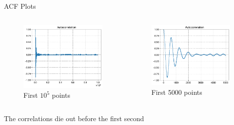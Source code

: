 \documentclass[
10pt,
aspectratio=169,
]{beamer}
\begin{document}
\begin{frame}[c]{ACF Plots}
\begin{columns}[onlytextwidth]
	\begin{figure}
	    \centering
	    \includegraphics[width=\linewidth]{autocorrelation_whole.png}
	    \caption{First $10^5$ points}
	    \label{fig:whole_acf}
	\end{figure}
	\begin{figure}
	    \centering
	    \includegraphics[width=\linewidth]{autocorrelation_5000.png}
	    \caption{First 5000 points}
	    \label{fig:5000_acf}
	\end{figure}
\end{columns}
\begin{center}
The correlations die out before the first second   
\end{center}
\end{frame}
\end{document}
